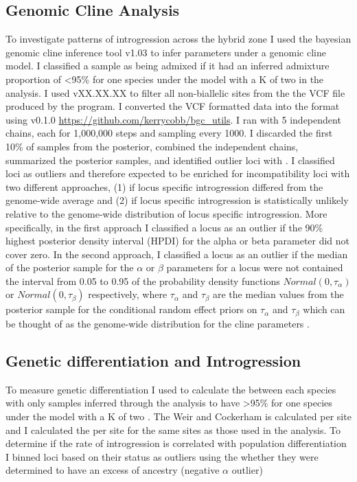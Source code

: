 \subsection{Genomic Cline Analysis}
To investigate patterns of introgression across the hybrid zone I     
used the bayesian genomic cline inference tool \bgc v1.03 \parencite{gompert2012} 
to infer parameters under a genomic cline model.
I classified a sample as being admixed if it had an inferred admixture proportion
of <95\% for one species under the model with a K of two in 
the \structure analysis.
I used \vcftools vXX.XX.XX to filter all non-biallelic sites from the the VCF file 
produced by the \populations program. 
I converted the VCF formatted data into the \bgc format using \bgcutils v0.1.0 
\url{https://github.com/kerrycobb/bgc_utils}.
I ran \bgc with 5 independent chains, each for 1,000,000 steps and sampling every 1000.
I discarded the first 10\% of samples from the posterior, combined the independent 
chains, summarized the posterior samples, and identified outlier loci with \bgcutils. 
I classified loci as outliers and therefore expected to be enriched for 
incompatibility loci with two different approaches, (1) if locus specific 
introgression differed from the genome-wide average and (2) if locus specific 
introgression is statistically unlikely relative to the genome-wide distribution
of locus specific introgression. 
More specifically, in the first approach I classified a locus as an outlier 
if the 90\% highest posterior density interval (HPDI) for the alpha or beta 
parameter did not cover zero.
In the second approach, I classified a locus as an outlier if the median of the  
posterior sample for the $\alpha$ or $\beta$ parameters for a locus were not contained 
the interval from 0.05 to 0.95 of the probability density functions $Normal(0, \tau_\alpha)$  
or $Normal(0, \tau_\beta)$ respectively, where $\tau_\alpha$ and $\tau_\beta$ are  
the median values from the posterior sample for the conditional random effect 
priors on $\tau_\alpha$ and $\tau_\beta$ which can be thought of as the genome-wide
distribution for the cline parameters \parencite{gompert2011}.

\subsection{Genetic differentiation and Introgression}
To measure genetic differentiation I used \vcftools to calculate the \cite{weir1984} \fst between 
each species with only samples inferred through the \structure analysis to have 
>95\% for one species under the model with a K of two \parencite{danecek2011}. 
The Weir and Cockerham \fst is calculated per site and I calculated the per site 
\fst for the same sites as those used in the \bgc analysis. 
To determine if the rate of introgression is correlated with population differentiation
I binned loci based on their status as outliers using the 
whether they were determined to have an excess of \amer 
ancestry (negative $\alpha$ outlier) 



